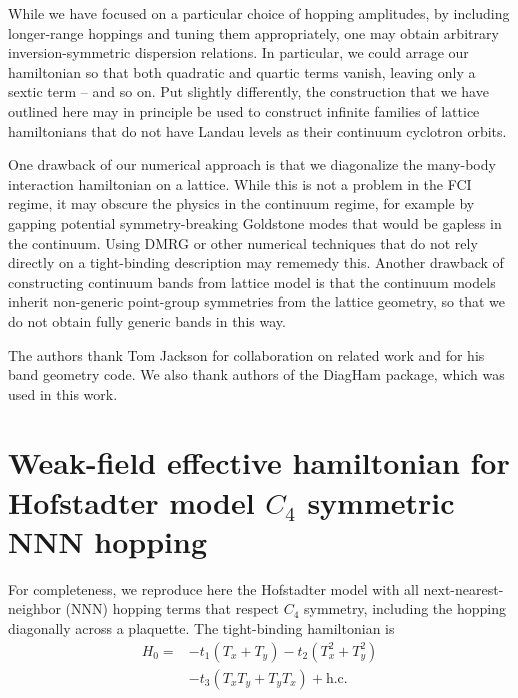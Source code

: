 \documentclass[aps,prb,twocolumn,letterpaper,twoside,nobalancelastpage,groupedaddress,amsmath,amssymb,floatfix,citeautoscript]{revtex4-1}
\begin{document}
While we have focused on a particular choice of hopping amplitudes, by including longer-range hoppings and tuning them appropriately, one may obtain arbitrary inversion-symmetric dispersion relations. In particular, we could arrage our hamiltonian so that both quadratic and quartic terms vanish, leaving only a sextic term -- and so on. Put slightly differently, the construction that we have outlined here may in principle be used to construct infinite families of lattice hamiltonians that do not have Landau levels as their continuum cyclotron orbits.

One drawback of our numerical approach is that we diagonalize the many-body interaction hamiltonian on a lattice. While this is not a problem in the FCI regime, it may obscure the physics in the continuum regime, for example by gapping potential symmetry-breaking Goldstone modes that would be gapless in the continuum. Using DMRG or other numerical techniques that do not rely directly on a tight-binding description may rememedy this. Another drawback of constructing continuum bands from lattice model is that the continuum models inherit non-generic point-group symmetries from the lattice geometry, so that we do not obtain fully generic bands in this way.

\begin{acknowledgments}
The authors thank Tom Jackson for collaboration on related work and for his band geometry code. We also thank authors of the DiagHam package, which was used in this work.

\end{acknowledgments}


%

\clearpage
\appendix
\section{Weak-field effective hamiltonian for Hofstadter model $C_4$ symmetric NNN hopping}
For completeness, we reproduce here the  Hofstadter model with all next-nearest-neighbor (NNN) hopping terms that respect $C_4$ symmetry, including the hopping diagonally across a plaquette. The tight-binding hamiltonian is
\begin{align*}
H_0 = &-t_1 \left(T_x + T_y\right)\nonumber - t_2 \left(T_x^{2} + T_y^{2}\right)\\ &- t_3 \left(T_xT_y + T_y T_x\right) + \text{h.c.}
\end{align*}
\end{document}
